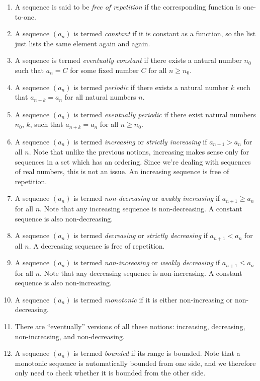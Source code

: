 \documentclass{amsart}
\begin{document}
\begin{enumerate}
\item A sequence is said to be {\em free of repetition} if the
  corresponding function is one-to-one.
\item A sequence $(a_n)$ is termed {\em constant} if it is constant as a
  function, so the list just lists the same element again and again.
\item A sequence is termed {\em eventually constant} if there exists a
  natural number $n_0$ such that $a_n = C$ for some fixed number $C$
  for all $n \ge n_0$.
\item A sequence $(a_n)$ is termed {\em periodic} if there exists a natural
  number $k$ such that $a_{n+k} = a_n$ for all natural numbers $n$.
\item A sequence $(a_n)$ is termed {\em eventually periodic} if there
  exist natural numbers $n_0$, $k$, such that $a_{n+k} = a_n$ for all $n
  \ge n_0$.
\item A sequence $(a_n)$ is termed {\em increasing} or {\em strictly
  increasing} if $a_{n+1} > a_n$ for all $n$. Note that unlike the
  previous notions, increasing makes sense only for sequences in a set
  which has an ordering. Since we're dealing with sequences of real
  numbers, this is not an issue. An increasing sequence is
  free of repetition.
\item A sequence $(a_n)$ is termed {\em non-decreasing} or {\em weakly
  increasing} if $a_{n+1} \ge a_n$ for all $n$. Note that any
  increasing sequence is non-decreasing. A constant sequence is also
  non-decreasing.
\item A sequence $(a_n)$ is termed {\em decreasing} or {\em strictly
  decreasing} if $a_{n+1} < a_n$ for all $n$. A decreasing sequence is
  free of repetition.
\item A sequence $(a_n)$ is termed {\em non-increasing} or {\em weakly
  decreasing} if $a_{n+1} \le a_n$ for all $n$. Note that any
  decreasing sequence is non-increasing. A constant sequence is also
  non-increasing.
\item A sequence $(a_n)$ is termed {\em monotonic} if it is either
  non-increasing or non-decreasing.
\item There are ``eventually'' versions of all these notions:
  increasing, decreasing, non-increasing, and non-decreasing.
\item A sequence $(a_n)$ is termed {\em bounded} if its range is
  bounded. Note that a monotonic sequence is automatically bounded
  from one side, and we therefore only need to check whether it is
  bounded from the other side.
\end{enumerate}
\end{document}
